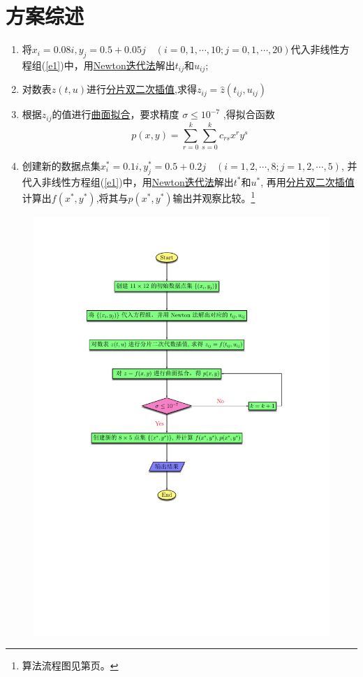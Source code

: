 \section{方案综述}
\begin{enumerate}
\item 将${x_i} = 0.08i,{y_j} = 0.5 + 0.05j\quad (i=0,1,\cdots,10;j=0,1,\cdots,20)$代入非线性方程组(\ref{e1})中，用\hyperref[sec:Newton]{Newton迭代法}解出$t_{ij}$和$u_{ij}$;

\item 对数表$z(t,u)$进行\hyperref[sec:Interpolation]{分片双二次插值},求得$z_{ij}=\hat{z}(t_{ij},u_{ij})$

\item 根据$z_{ij}$的值进行\hyperref[sec:qmnh]{曲面拟合}，要求精度
$\sigma \le 10^{-7}$
,得拟合函数
\[p(x,y) = \sum_{r = 0}^k\sum_{s = 0}^k {{c_{rs}}{x^r}{y^s}} \]

\item 
创建新的数据点集$x_i^{\ast}=0.1i,y_j^{\ast}=0.5+0.2j\quad (i = 1, 2,\cdots,8;j = 1,2,\cdots,5)$,
并代入非线性方程组(\ref{e1})中，用\hyperref[sec:Newton]{Newton迭代法}解出$t^{\ast}$和$u^{\ast}$,
再用\hyperref[sec:Interpolation]{分片双二次插值}计算出$f(x^{\ast},y^{\ast})$,将其与$p(x^{\ast},y^{\ast})$输出并观察比较。\footnote{算法流程图见第\pageref{flow}页。}
\end{enumerate}




\newpage
\begin{figure}[h]
\small
\centering
\label{flow}
\includegraphics[width=17cm]{flow1}
\end{figure}

